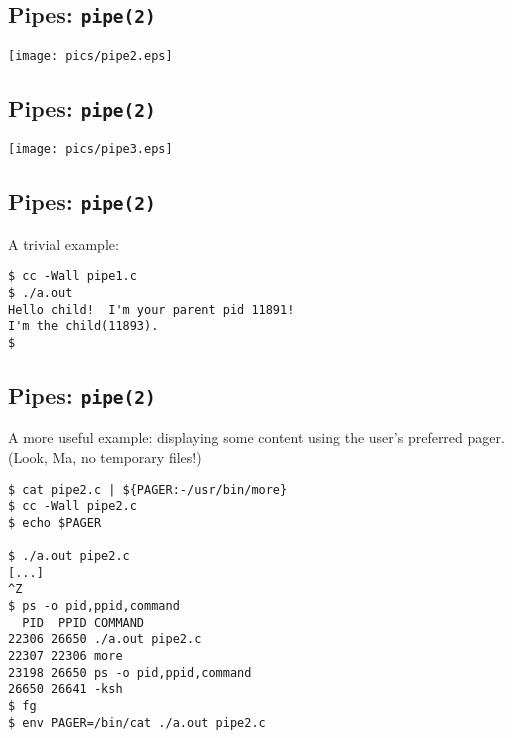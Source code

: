 \documentclass[xga]{xdvislides}
\begin{document}
\subsection{Pipes: {\tt pipe(2)}}
\begin{center}
	\texttt{[image: pics/pipe2.eps]}
\end{center}

\subsection{Pipes: {\tt pipe(2)}}
\begin{center}
	\texttt{[image: pics/pipe3.eps]}
\end{center}

\subsection{Pipes: {\tt pipe(2)}}
A trivial example:

\begin{verbatim}
$ cc -Wall pipe1.c
$ ./a.out
Hello child!  I'm your parent pid 11891!
I'm the child(11893).
$
\end{verbatim}
\vfill

\subsection{Pipes: {\tt pipe(2)}}
A more useful example: displaying some content using the user's preferred
pager.  (Look, Ma, no temporary files!)
\begin{verbatim}
$ cat pipe2.c | ${PAGER:-/usr/bin/more}
$ cc -Wall pipe2.c
$ echo $PAGER

$ ./a.out pipe2.c
[...]
^Z
$ ps -o pid,ppid,command
  PID  PPID COMMAND
22306 26650 ./a.out pipe2.c
22307 22306 more
23198 26650 ps -o pid,ppid,command
26650 26641 -ksh
$ fg
$ env PAGER=/bin/cat ./a.out pipe2.c
\end{verbatim}
\end{document}
